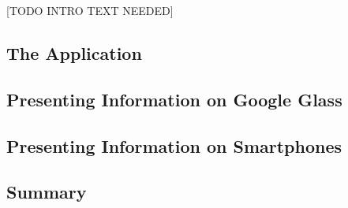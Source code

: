 
[TODO INTRO TEXT NEEDED]


\subsection{The Application}
\label{subsec:application}


\subsection{Presenting Information on Google Glass}
\label{subsec:informationlimitedspace}


\subsection{Presenting Information on Smartphones}
\label{subsec:smartphones}


\subsection{Summary}
\label{subsec:summary}
